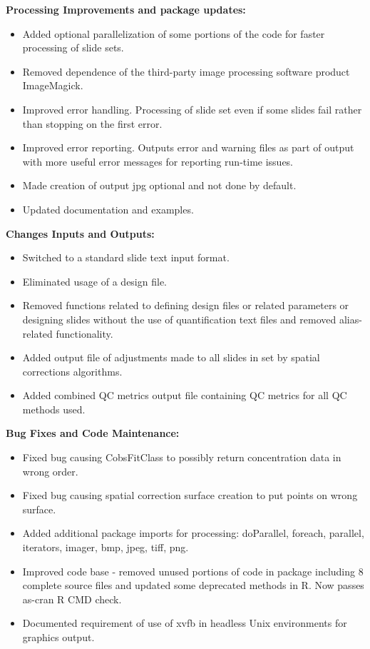 \documentclass[
]{article}
\providecommand{\tightlist}{%
  \setlength{\itemsep}{0pt}\setlength{\parskip}{0pt}}
\begin{document}
\textbf{Processing Improvements and package updates:}

\begin{itemize}
\tightlist
\item
  Added optional parallelization of some portions of the code for faster
  processing of slide sets.
\item
  Removed dependence of the third-party image processing software
  product ImageMagick.
\item
  Improved error handling. Processing of slide set even if some slides
  fail rather than stopping on the first error.
\item
  Improved error reporting. Outputs error and warning files as part of
  output with more useful error messages for reporting run-time issues.
\item
  Made creation of output jpg optional and not done by default.
\item
  Updated documentation and examples.
\end{itemize}

\textbf{Changes Inputs and Outputs:}

\begin{itemize}
\tightlist
\item
  Switched to a standard slide text input format.
\item
  Eliminated usage of a design file.
\item
  Removed functions related to defining design files or related
  parameters or designing slides without the use of quantification text
  files and removed alias-related functionality.
\item
  Added output file of adjustments made to all slides in set by spatial
  corrections algorithms.
\item
  Added combined QC metrics output file containing QC metrics for all QC
  methods used.
\end{itemize}

\textbf{Bug Fixes and Code Maintenance:}

\begin{itemize}
\tightlist
\item
  Fixed bug causing CobsFitClass to possibly return concentration data
  in wrong order.
\item
  Fixed bug causing spatial correction surface creation to put points on
  wrong surface.
\item
  Added additional package imports for processing: doParallel, foreach,
  parallel, iterators, imager, bmp, jpeg, tiff, png.
\item
  Improved code base - removed unused portions of code in package
  including 8 complete source files and updated some deprecated methods
  in R. Now passes as-cran R CMD check.
\item
  Documented requirement of use of xvfb in headless Unix environments
  for graphics output.
\end{itemize}
\end{document}
